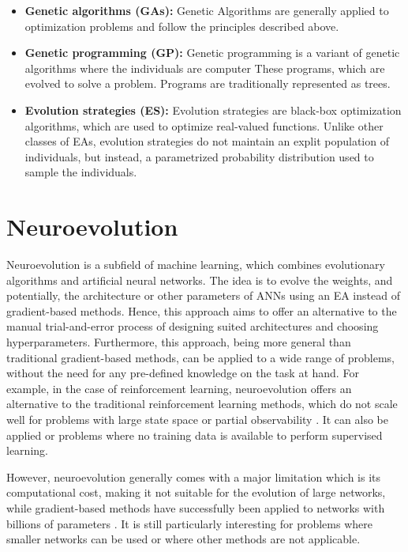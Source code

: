 \begin{itemize}
    \item \textbf{Genetic algorithms (GAs):} Genetic Algorithms \cite{genetic_alg,genetic_alg_review} are generally applied to optimization problems and follow the principles described above.
    \item \textbf{Genetic programming (GP):} Genetic programming \cite{cartesian_gp} is a variant of genetic algorithms where the individuals are computer These programs, which are evolved to
        solve a problem. Programs are traditionally represented as trees.
    \item \textbf{Evolution strategies (ES):} Evolution strategies \cite{es_intro} are black-box optimization algorithms, which are used to optimize real-valued functions.
        Unlike other classes of EAs, evolution strategies do not maintain an explit population of individuals, but instead, a parametrized probability distribution
        used to sample the individuals.
\end{itemize}

\section{Neuroevolution}

Neuroevolution is a subfield of machine learning, which combines evolutionary algorithms and artificial neural networks. The idea is to evolve the weights,
and potentially, the architecture or other parameters of ANNs using an EA instead of gradient-based methods. Hence, this approach aims to
offer an alternative to the manual trial-and-error process of designing suited architectures and choosing hyperparameters. Furthermore, this approach,
being more general than traditional gradient-based methods, can be applied to a wide range of problems, without the need for any pre-defined knowledge on the task
at hand. For example, in the case of reinforcement learning, neuroevolution offers an alternative to the traditional reinforcement learning methods, which do not
scale well for problems with large state space or partial observability \cite{challenges_of_rl,rl_control}. It can also be applied or problems where no training
data is available to perform supervised learning.

However, neuroevolution generally comes with a major limitation which is its computational cost, making it not suitable for the evolution of large networks,
while gradient-based methods have successfully been applied to networks with billions of parameters \cite{llama3}.
It is still particularly interesting for problems where smaller networks can be used or where other methods are not applicable.

